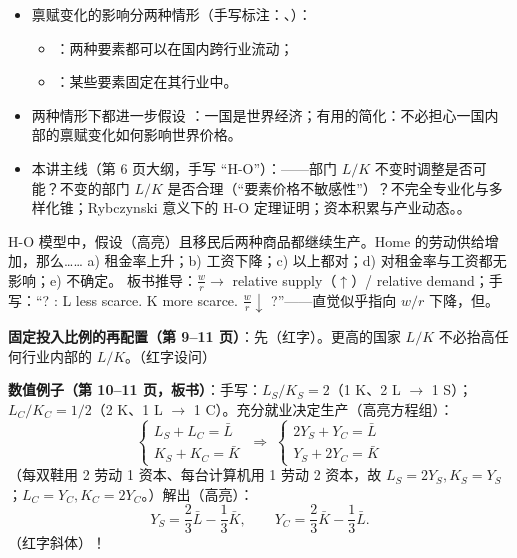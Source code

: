 \begin{assumpbox}[本讲的设定（第 5--6 页）]
\begin{itemize}
  \item 禀赋变化的影响分两种情形（手写标注：、）：
    \begin{itemize}
      \item {}：两种要素都可以在国内跨行业流动；
      \item {}：某些要素固定在其行业中。
    \end{itemize}
  \item 两种情形下都进一步假设 ：一国是世界经济；有用的简化：不必担心一国内部的禀赋变化如何影响世界价格。
  \item 本讲主线（第 6 页大纲，手写 ``H-O''）：——部门 $L/K$ 不变时调整是否可能？不变的部门 $L/K$ 是否合理（``要素价格不敏感性''）？不完全专业化与多样化锥；Rybczynski 意义下的 H-O 定理证明；资本积累与产业动态。。
\end{itemize}
\end{assumpbox}

\begin{exbox}
H-O 模型中，假设（高亮）且移民后两种商品都继续生产。Home 的劳动供给增加，那么……
a) 租金率上升；b) 工资下降；c) 以上都对；d) 对租金率与工资都无影响；e) 不确定。
板书推导：$\frac{w}{r} \to$ relative supply（$\uparrow$）/ relative demand；手写：``? : L less scarce. K more scarce. $\frac{w}{r} \downarrow$ ?''——直觉似乎指向 $w/r$ 下降，但。
\end{exbox}


\textbf{固定投入比例的再配置（第 9--11 页）}：先（红字）。更高的国家 $L/K$ 不必抬高任何行业内部的 $L/K$。（红字设问）

\textbf{数值例子（第 10--11 页，板书）}：手写：$L_S/K_S = 2$（1 K、2 L $\to$ 1 S）；$L_C/K_C = 1/2$（2 K、1 L $\to$ 1 C）。充分就业决定生产（高亮方程组）：
\[
\begin{cases} L_S + L_C = \bar{L} \\ K_S + K_C = \bar{K} \end{cases}
\;\Longrightarrow\;
\begin{cases} 2Y_S + Y_C = \bar{L} \\ Y_S + 2Y_C = \bar{K} \end{cases}
\]
（每双鞋用 2 劳动 1 资本、每台计算机用 1 劳动 2 资本，故 $L_S = 2Y_S, K_S = Y_S$；$L_C = Y_C, K_C = 2Y_C$。）解出（高亮）：
\[
Y_S = \frac{2}{3}\bar{L} - \frac{1}{3}\bar{K}, \qquad
Y_C = \frac{2}{3}\bar{K} - \frac{1}{3}\bar{L}.
\]
（红字斜体）！

